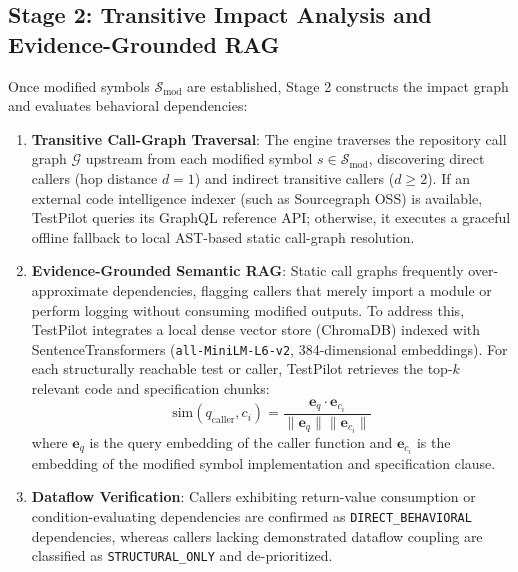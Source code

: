 \documentclass[12pt,onecolumn,draftclsnofoot]{IEEEtran}
\begin{document}
\subsection{Stage 2: Transitive Impact Analysis and Evidence-Grounded RAG}
Once modified symbols $\mathcal{S}_{\text{mod}}$ are established, Stage 2 constructs the impact graph and evaluates behavioral dependencies:
\begin{enumerate}
    \item \textbf{Transitive Call-Graph Traversal}: The engine traverses the repository call graph $\mathcal{G}$ upstream from each modified symbol $s \in \mathcal{S}_{\text{mod}}$, discovering direct callers (hop distance $d=1$) and indirect transitive callers ($d \ge 2$). If an external code intelligence indexer (such as Sourcegraph OSS) is available, TestPilot queries its GraphQL reference API; otherwise, it executes a graceful offline fallback to local AST-based static call-graph resolution.
    \item \textbf{Evidence-Grounded Semantic RAG}: Static call graphs frequently over-approximate dependencies, flagging callers that merely import a module or perform logging without consuming modified outputs. To address this, TestPilot integrates a local dense vector store (ChromaDB) indexed with SentenceTransformers (\texttt{all-MiniLM-L6-v2}, 384-dimensional embeddings). For each structurally reachable test or caller, TestPilot retrieves the top-$k$ relevant code and specification chunks:
    \begin{equation}
    \text{sim}(q_{\text{caller}}, c_i) = \frac{\mathbf{e}_{q} \cdot \mathbf{e}_{c_i}}{\|\mathbf{e}_{q}\| \|\mathbf{e}_{c_i}\|}
    \end{equation}
    where $\mathbf{e}_q$ is the query embedding of the caller function and $\mathbf{e}_{c_i}$ is the embedding of the modified symbol implementation and specification clause.
    \item \textbf{Dataflow Verification}: Callers exhibiting return-value consumption or condition-evaluating dependencies are confirmed as \texttt{DIRECT\_BEHAVIORAL} dependencies, whereas callers lacking demonstrated dataflow coupling are classified as \texttt{STRUCTURAL\_ONLY} and de-prioritized.
\end{enumerate}
\end{document}
